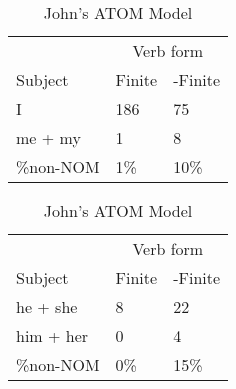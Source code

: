 \begin{table}[]
    \caption{John's ATOM Model}
    \begin{minipage}{0.5\textwidth}
    \centering
    \begin{tabular}{@{}lll@{}}
        \toprule
         &\multicolumn{2}{c}{Verb form}\\
         \cline{2-3}
        Subject & Finite & -Finite \\
        \midrule
        I & 186 & 75 \\
        me + my & 1 & 8 \\
        \hline
        \%non-NOM & 1\% & 10\% \\
        \bottomrule
    \end{tabular}
\end{minipage}
\begin{minipage}{0.5\textwidth}
    \centering
    \begin{tabular}{@{}lll@{}}
        \toprule
         &\multicolumn{2}{c}{Verb form}\\
         \cline{2-3}
        Subject & Finite & -Finite \\
        \midrule
        he + she & 8 & 22 \\
        him + her & 0 & 4 \\
        \hline
        \%non-NOM & 0\% & 15\% \\
        \bottomrule
    \end{tabular}
    \end{minipage}
    \begin{minipage}{0.5\textwidth}
    

\end{minipage}
\end{table}
